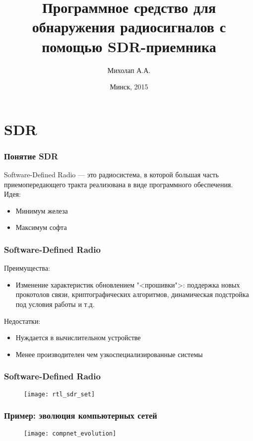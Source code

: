 \documentclass[14pt,russian]{beamer}
\title{Программное средство для обнаружения радиосигналов с помощью SDR-приемника}
\author{Михолап А.А.}
\institute{Белорусский государственный университет информатики и радиоэлектроники}
\date{Минск, 2015}
\begin{document}
\begin{frame}
  \titlepage
\end{frame}


\section{SDR}

\begin{frame}
  \frametitle{Понятие SDR}
  Software-Defined Radio --- это радиосистема, в которой большая часть приемопередающего тракта реализована в виде программного обеспечения.\\
  \vspace{1cm}
  Идея:
  \begin{itemize}
    \item{Минимум железа}
    \item{Максимум софта}
  \end{itemize}
\end{frame}

\begin{frame}
  \frametitle{Software-Defined Radio}
  Преимущества:
  \begin{itemize}
    \item{Изменение характеристик обновлением "<прошивки">: поддержка новых прокотолов связи, криптографических алгоритмов, динамическая подстройка под условия работы и т.д.}
  \end{itemize}
  Недостатки:
  \begin{itemize}
    \item{Нуждается в вычислительном устройстве}
    \item{Менее производителен чем узкоспециализированные системы}
  \end{itemize}
\end{frame}

\begin{frame}
  \frametitle{Software-Defined Radio}
  \begin{figure}
    \texttt{[image: rtl\_sdr\_set]}
  \end{figure}
\end{frame}

\begin{frame}
  \frametitle{Пример: эволюция компьютерных сетей}
  \begin{figure}
    \texttt{[image: compnet\_evolution]}
  \end{figure}
\end{frame}
\end{document}
